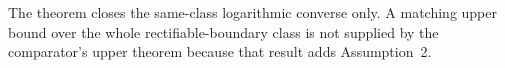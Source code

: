 The theorem closes the same-class logarithmic converse only.  A matching upper bound over the whole rectifiable-boundary class is not supplied by the comparator's upper theorem because that result adds Assumption~2.